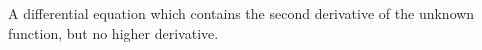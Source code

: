 A differential equation which contains the second derivative of the unknown
function, but no higher derivative.